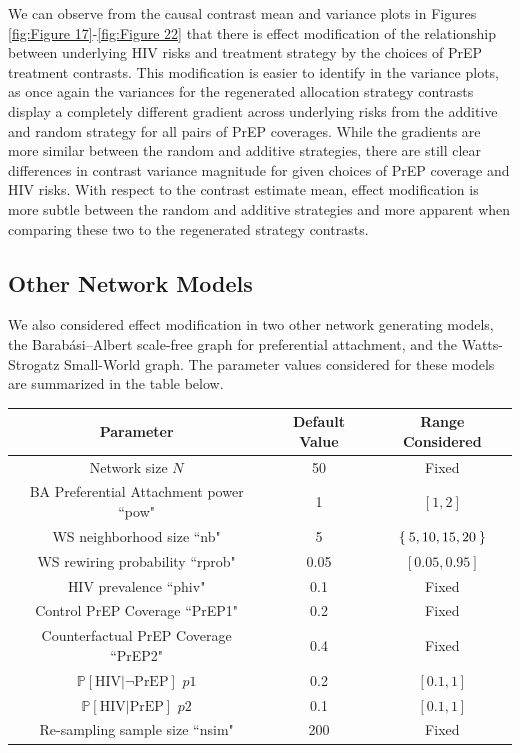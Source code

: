 \documentclass{article}
\theoremstyle{definition}
\begin{document}
We can observe from the causal contrast mean and variance plots in Figures \ref{fig:Figure 17}-\ref{fig:Figure 22} that there is effect modification of the relationship between underlying HIV risks and treatment strategy by the choices of PrEP treatment contrasts. This modification is easier to identify in the variance plots, as once again the variances for the regenerated allocation strategy contrasts display a completely different gradient across underlying risks from the additive and random strategy for all pairs of PrEP coverages. While the gradients are more similar between the random and additive strategies, there are still clear differences in contrast variance magnitude for given choices of PrEP coverage and HIV risks. With respect to the contrast estimate mean, effect modification is more subtle between the random and additive strategies and more apparent when comparing these two to the regenerated strategy contrasts. 
\subsection{Other Network Models}
We also considered effect modification in two other network generating models, the Barabási–Albert scale-free graph for preferential attachment, and the Watts-Strogatz Small-World graph. The parameter values considered for these models are summarized in the table below.
\begin{center}
    \begin{tabular}{|c|c|c|}
    \hline
         Parameter & Default Value & Range Considered  \\
         \hline
         Network size $N$& 50 & Fixed \\
         \hline
         BA Preferential Attachment power ``pow" & 1 & $\left[1,2 \right]$ \\
         \hline
         WS neighborhood size ``nb" & 5 & $\Set{5,10,15,20}$ \\
         \hline
         WS rewiring probability ``rprob" & 0.05 &$\left[0.05, 0.95 \right]$ \\
         \hline
         HIV prevalence ``phiv" & 0.1 & Fixed\\
         \hline
         Control PrEP Coverage ``PrEP1" & 0.2 & Fixed\\
         \hline
         Counterfactual PrEP Coverage ``PrEP2" & 0.4 & Fixed\\
         \hline
         $\mathbb{P}\left[\text{HIV} \vert \neg \text{PrEP}\right]$ $p1$ & 0.2 & $[0.1,1]$\\
         \hline
         $\mathbb{P}\left[\text{HIV} \vert \text{PrEP}\right]$ $p2$ & 0.1 & $[0.1,1]$\\
         \hline
         Re-sampling sample size ``nsim" & 200 & Fixed\\
         \hline
    \end{tabular}
\end{center}
\end{document}
